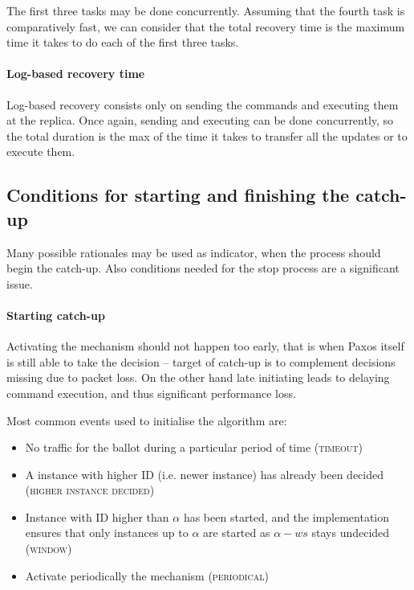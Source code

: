 The first three tasks may be done concurrently. Assuming that the fourth task is comparatively fast, we can consider that the total recovery time is the maximum time it takes to do each of the first three tasks.

\paragraph{Log-based recovery time}

Log-based recovery consists only on sending the commands and executing them at the replica. Once again, sending and executing can be done concurrently, so the total duration is the max of the time it takes to transfer all the updates or to execute them.

\subsection{Conditions for starting and finishing the catch-up}
\label{subsec:conditions_for_starting_and_finishing_the_catch_up}
Many possible rationales may be used as indicator, when the process should begin the catch-up. Also conditions needed for the stop process are a significant issue.

\paragraph*{Starting catch-up}
Activating the mechanism should not happen too early, that is when Paxos itself is still able to take the decision -- target of catch-up is to complement decisions missing due to packet loss. On the other hand late initiating leads to delaying command execution, and thus significant performance loss.

Most common events used to initialise the algorithm are:
\begin{itemize}
  \item No traffic for the ballot during a particular period of time (\textsc{timeout})
  \item A instance with higher ID (i.e. newer instance) has already been decided (\textsc{higher instance decided})
  \item Instance with ID higher than $\alpha$ has been started, and the implementation ensures that only instances up to $\alpha$ are started as $\alpha-ws$ stays undecided (\textsc{window})
  \item Activate periodically the mechanism (\textsc{periodical})
\end{itemize}

